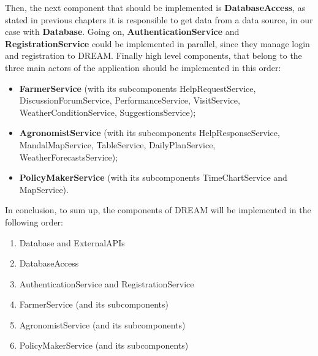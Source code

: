 Then, the next component that should be implemented is \textbf{DatabaseAccess}, as stated in previous chapters it is responsible to get data from a data source, in our case with \textbf{Database}.\newline
Going on, \textbf{AuthenticationService} and \textbf{RegistrationService} could be implemented in parallel, since they manage login and registration to DREAM.\newline
Finally high level components, that belong to the three main actors of the application should be implemented in this order: 
\begin{itemize}
    \item \textbf{FarmerService} (with its subcomponents HelpRequestService, DiscussionForumService, PerformanceService, VisitService, WeatherConditionService, SuggestionsService);
    \item \textbf{AgronomistService} (with its subcomponents HelpResponseService, MandalMapService, TableService, DailyPlanService, \newline WeatherForecastsService);
    \item \textbf{PolicyMakerService} (with its subcomponents TimeChartService and MapService).
\end{itemize}
In conclusion, to sum up, the components of DREAM will be implemented in the following order:
\begin{enumerate}
  \item Database and ExternalAPIs
  \item DatabaseAccess
  \item AuthenticationService and RegistrationService
  \item FarmerService (and its subcomponents)
  \item AgronomistService (and its subcomponents)
  \item PolicyMakerService (and its subcomponents)
\end{enumerate}
\newpage